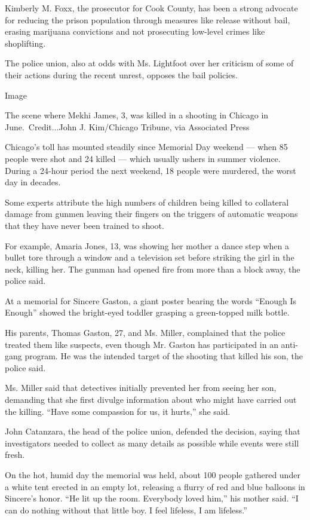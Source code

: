 Kimberly M. Foxx, the prosecutor for Cook County, has been a strong
advocate for reducing the prison population through measures like
release without bail, erasing marijuana convictions and not prosecuting
low-level crimes like shoplifting.

The police union, also at odds with Ms. Lightfoot over her criticism of
some of their actions during the recent unrest, opposes the bail
policies.

Image

The scene where Mekhi James, 3, was killed in a shooting in Chicago in
June.~Credit...John J. Kim/Chicago Tribune, via Associated Press

Chicago's toll has mounted steadily since Memorial Day weekend --- when
85 people were shot and 24 killed --- which usually ushers in summer
violence. During a 24-hour period the next weekend, 18 people were
murdered, the worst day in decades.

Some experts attribute the high numbers of children being killed to
collateral damage from gunmen leaving their fingers on the triggers of
automatic weapons that they have never been trained to shoot.

For example, Amaria Jones, 13, was showing her mother a dance step when
a bullet tore through a window and a television set before striking the
girl in the neck, killing her. The gunman had opened fire from more than
a block away, the police said.

At a memorial for Sincere Gaston, a giant poster bearing the words
``Enough Is Enough'' showed the bright-eyed toddler grasping a
green-topped milk bottle.

His parents, Thomas Gaston, 27, and Ms. Miller, complained that the
police treated them like suspects, even though Mr. Gaston has
participated in an anti-gang program. He was the intended target of the
shooting that killed his son, the police said.

Ms. Miller said that detectives initially prevented her from seeing her
son, demanding that she first divulge information about who might have
carried out the killing. ``Have some compassion for us, it hurts,'' she
said.

John Catanzara, the head of the police union, defended the decision,
saying that investigators needed to collect as many details as possible
while events were still fresh.

On the hot, humid day the memorial was held, about 100 people gathered
under a white tent erected in an empty lot, releasing a flurry of red
and blue balloons in Sincere's honor. ``He lit up the room. Everybody
loved him,'' his mother said. ``I can do nothing without that little
boy. I feel lifeless, I am lifeless.''

